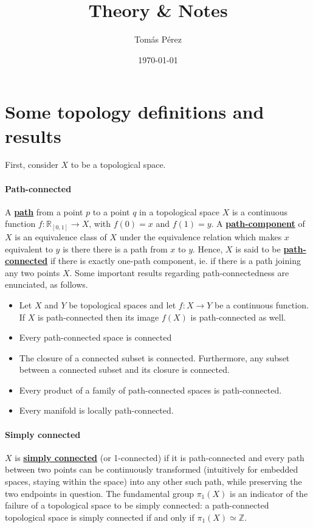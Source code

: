 \documentclass{homework}
\author{Tomás Pérez}
\date{\today}
\title{Theory \& Notes}
\begin{document}
 \maketitle

\section{Some topology definitions and results}

First, consider $X$ to be a topological space.\\

\paragraph{\textbf{Path-connected}}

A \textbf{\underline{path}} from a point $p$ to a point $q$ in a topological space $X$ is a continuous function $f: \mathds{R}_{[0,1]} \to X$, with $f(0) = x$ and $f(1) = y$. A \textbf{\underline{path-component}} of $X$ is an equivalence class of $X$ under the equivalence relation which makes $x$ equivalent to $y$ is there there is a path from $x$ to $y$. Hence, $X$ is said to be \textbf{\underline{path-connected}} if there is exactly one-path component, ie. if there is a path joining any two points $X$. Some important results regarding path-connectedness are enunciated, as follows.

\begin{itemize}
    \item Let $X$ and $Y$ be topological spaces and let $f: X \to Y$ be a continuous function. If $X$ is path-connected then its image $f(X)$ is path-connected as well. 
    \item Every path-connected space is connected
    \item The closure of a connected subset is connected. Furthermore, any subset between a connected subset and its closure is connected. 
    \item Every product of a family of path-connected  spaces is path-connected.
    \item Every manifold is locally path-connected. \\
\end{itemize}

\paragraph{\textbf{Simply connected}}

$X$ is \textbf{\underline{simply connected}} (or 1-connected) if it is path-connected and every path between two points can be continuously transformed (intuitively for embedded spaces, staying within the space) into any other such path, while preserving the two endpoints in question. The fundamental group $\pi_1(X)$ is an indicator of the failure of a topological space to be simply connected: a path-connected topological space is simply connected if and only if $\pi_1(X) \simeq \mathds{Z}$. \\
\end{document}
